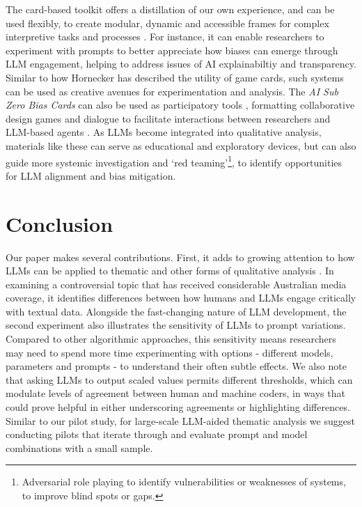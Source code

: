 \documentclass{article}
\begin{document}
The card-based toolkit offers a distillation of our own experience, and can be used flexibly, to create modular, dynamic and accessible frames for complex interpretive tasks and processes \cite{hsiehWhatCardsExploring2023, royCardbasedDesignTools2019}. For instance, it can enable researchers to experiment with prompts to better appreciate how biases can emerge through LLM engagement, helping to address issues of AI explainabiltiy and transparency. Similar to how Hornecker \cite{horneckerCreativeIdeaExploration2010} has described the utility of game cards, such systems can be used as creative avenues for experimentation and analysis. The \emph{AI Sub Zero Bias Cards} can also be used as participatory tools \cite{sandersFrameworkOrganizingTools2010}, formatting collaborative design games and dialogue \cite{brandtFacilitatingCollaborationDesign2004, brandtFormattingDesignDialogues2008} to facilitate interactions between researchers and LLM-based agents \cite{atlas.tiATLASTiAI2024}. As LLMs become integrated into qualitative analysis, materials like these can serve as educational and exploratory devices, but can also guide more systemic investigation and `red teaming'\footnote{Adversarial role playing to identify vulnerabilities or weaknesses of systems, to improve blind spots or gaps.}, to identify opportunities for LLM alignment and bias mitigation.

\section{Conclusion}\label{discussion-conclusion}

Our paper makes several contributions. First, it adds to growing attention to how LLMs can be applied to thematic and other forms of qualitative analysis  \cite{depaoliPerformingInductiveThematic2023, gaoCollabCoderLowerbarrierRigorous2024, jiangSupportingSerendipityOpportunities2021}. In examining a controversial topic that has received considerable Australian media coverage, it identifies differences between how humans and LLMs engage critically with textual data. Alongside the fast-changing nature of LLM development, the second experiment also illustrates the sensitivity of LLMs to prompt variations. Compared to other algorithmic approaches, this sensitivity means researchers may need to spend more time experimenting with options - different models, parameters and prompts - to understand their often subtle effects. We also note that asking LLMs to output scaled values permits different thresholds, which can modulate levels of agreement between human and machine coders, in ways that could prove helpful in either underscoring agreements or highlighting differences. Similar to our pilot study, for large-scale LLM-aided thematic analysis we suggest conducting pilots that iterate through and evaluate prompt and model combinations with a small sample. 
\end{document}

